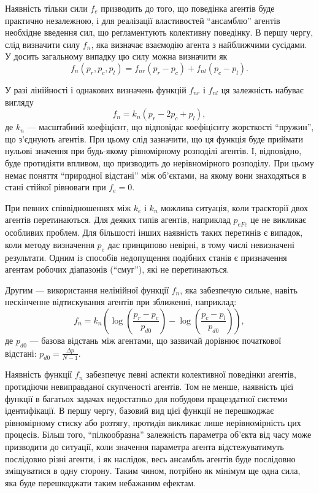 Наявність тільки сили $f_e$ призводить до того, що поведінка агентів буде
практично незалежною, і для реалізації властивостей ``ансамблю'' агентів
необхідне введення сил, що регламентують колективну поведінку. В першу чергу,
слід визначити силу $f_n$, яка визначає взаємодію агента з найближчими
сусідами. У досить загальному випадку цю силу можна визначити як
%
\begin{equation}
  f_n( p_r, p_c, p_l ) = f_{nr}(p_r-p_c) + f_{nl}(p_c-p_l).
  \label{atu:eq:f_n_gen}
\end{equation}

У разі лінійності і однакових визначень функцій $f_{nr}$ і $f_{nl}$ ця залежність набуває вигляду
%
\begin{equation}
  f_n = k_n ( p_r - 2 p_c + p_l ),
  \label{atu:eq:f_n_lin}
\end{equation}
%
де $k_n$ --- масштабний коефіцієнт, що відповідає коефіцієнту жорсткості
``пружин'', що з'єднують агентів. При цьому слід зазначити, що ця функція буде
приймати нульові значення при будь-якому рівномірному розподілі агентів.
І, відповідно, буде протидіяти впливом, що призводить до
нерівномірного розподілу. При цьому немає поняття ``природної відстані''
між об'єктами, на якому вони знаходяться в стані стійкої рівноваги при
$ f_e = 0 $.

При певних співвідношеннях між
$ k_e $ і
$ k_n $ можлива ситуація, коли траєкторії двох агентів
перетинаються. Для деяких типів агентів, наприклад
$ p_{eFc} $ це не викликає особливих проблем. Для більшості інших
наявність таких перетинів є випадок, коли методу визначення
$ p_e $ дає принципово невірні, в тому числі невизначені
результати. Одним із способів недопущення подібних станів є
призначення агентам робочих діапазонів (``смуг''), які не перетинаються.

Другим --- використання нелінійної функції $f_n$,
яка забезпечую сильне, навіть нескінченне відтискування
агентів при зближенні, наприклад:
%
\begin{equation}
  f_n = k_n \left( \log\left( \frac{p_r-p_c}{p_{d0}} \right) -  \log\left( \frac{p_c-p_l}{p_{d0}}\right) \right),
  \label{atu:eq:f_n_log}
\end{equation}
%
де
$p_{d0}$ ---
базова відстань між агентами, що зазвичай дорівнює початкової відстані:
$p_{d0} = \frac{\Delta p}{N-1}$.




Наявність функції
$ f_n $ забезпечує певні аспекти колективної поведінки агентів,
протидіючи невиправданої скупченості агентів. Том не менше,
наявність цієї функції в багатьох задачах недостатньо для
побудови працездатної системи ідентифікації. В першу чергу,
базовий вид цієї функції не перешкоджає рівномірному стиску
або розтягу, протидія викликає лише нерівномірність цих
процесів. Більш того, ``пілкообразна'' залежність параметра
об'єкта від часу може призводити до ситуації, коли значення
параметра агента відстежуватимуть послідовно різні агенти, і
як наслідок, весь ансамбль агентів буде послідовно зміщуватися
в одну сторону. Таким чином, потрібно як мінімум ще одна сила,
яка буде перешкоджати таким небажаним ефектам.

